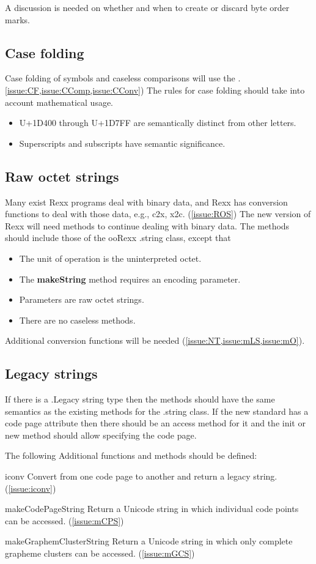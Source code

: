 \documentclass[b4paper]{article}
\begin{document}
A discussion is needed on whether and when to create or discard byte order marks.

\subsection{Case folding}

Case folding of symbols and caseless comparisons will use the .
\cref{issue:CF,issue:CComp,issue:CConv})
The rules for case folding should take into account mathematical usage.
\begin{itemize}
\item U+1D400 through U+1D7FF are semantically distinct from other letters.
\item Superscripts and subscripts have semantic significance.
\end{itemize}

\subsection{Raw octet strings}
Many exist Rexx programs deal with binary data,
and Rexx has conversion functions to deal with those data,
e.g., c2x, x2c.
(\cref{issue:ROS})
The new version of Rexx will need methods to continue dealing with binary data.
The methods should include those of the ooRexx .string class, except that
\begin{itemize}
\item The unit of operation is the uninterpreted octet.
\item The \textbf{makeString} method requires an encoding parameter.
\item Parameters are raw octet strings.
\item There are no caseless methods.
\end{itemize}

Additional conversion functions will be needed (\cref{issue:NT,issue:mLS,issue:mO}).

\subsection{Legacy strings}

If there is a .Legacy string type then the methods should have the
same semantics as the existing methods for the .string class.
If the new standard has a code page attribute then there should be an
access method for it and the init or new method should allow
specifying the code page.

The following Additional functions and methods should be defined:
\begin{definition}
\item [iconv] %
Convert from one code page to another and return a legacy string. (\cref{issue:iconv})
\item [makeCodePageString] %
Return a Unicode string in which individual code points can be accessed. (\cref{issue:mCPS})
\item [makeGraphemClusterString] %
Return a Unicode string in which only complete grapheme clusters can be accessed. (\cref{issue:mGCS})
\end{definition}
\end{document}
